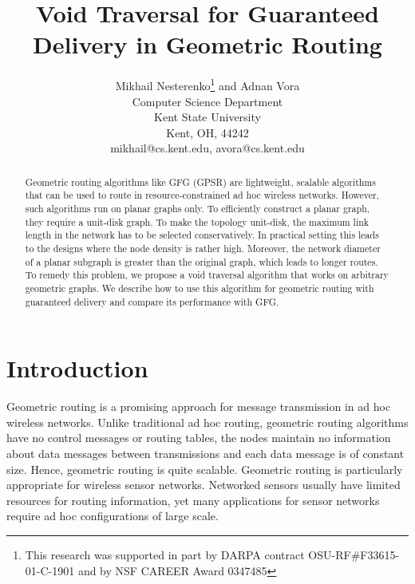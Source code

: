 \documentclass[conference]{IEEEtran}
\begin{document}
\title{Void Traversal for Guaranteed Delivery in Geometric Routing}
\date{}

\author{Mikhail Nesterenko\thanks{This research was
supported in part by DARPA contract OSU-RF\#F33615-01-C-1901
and by NSF CAREER Award 0347485}
and Adnan Vora \\
Computer Science Department \\
Kent State University \\
Kent, OH, 44242 \\
mikhail@cs.kent.edu, avora@cs.kent.edu \\
}

\date{}

\maketitle

\begin{abstract}
Geometric routing algorithms like GFG (GPSR) are lightweight, scalable
algorithms that can be used to route in resource-constrained ad hoc
wireless networks.  However, such algorithms run on planar graphs
only.  To efficiently construct a planar graph, they require a
unit-disk graph. To make the topology unit-disk, the maximum link
length in the network has to be selected conservatively. In practical
setting this leads to the designs where the node density is rather
high. Moreover, the network diameter of a planar subgraph is greater
than the original graph, which leads to longer routes. To remedy this
problem, we propose a void traversal algorithm that works on arbitrary
geometric graphs. We describe how to use this algorithm for geometric
routing with guaranteed delivery and compare its performance with GFG.
\end{abstract}


\section{Introduction} \label{SecIntro}
Geometric routing is a promising approach for message transmission in
ad hoc wireless networks.  Unlike traditional ad hoc routing,
geometric routing algorithms have no control messages or routing
tables, the nodes maintain no information about data messages between
transmissions and each data message is of constant size. Hence,
geometric routing is quite scalable. Geometric routing is particularly
appropriate for wireless sensor networks. Networked sensors usually
have limited resources for routing information, yet many applications
for sensor networks require ad hoc configurations of large scale.
\end{document}
